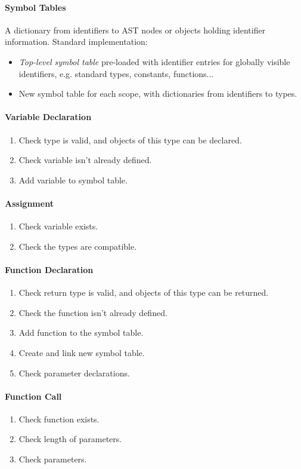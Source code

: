 \documentclass[twocolumn,english]{article}
\begin{document}
\paragraph{Symbol Tables}

A dictionary from identifiers to AST nodes or objects holding identifier
information. Standard implementation:
\begin{itemize}
\item \emph{Top-level symbol table} pre-loaded with identifier entries for
globally visible identifiers, e.g. standard types, constants, functions...
\item New symbol table for each scope, with dictionaries from identifiers
to types.
\end{itemize}

\paragraph{Variable Declaration}
\begin{enumerate}
\item Check type is valid, and objects of this type can be declared.
\item Check variable isn't already defined.
\item Add variable to symbol table.
\end{enumerate}

\paragraph{Assignment}
\begin{enumerate}
\item Check variable exists.
\item Check the types are compatible.
\end{enumerate}

\paragraph{Function Declaration}
\begin{enumerate}
\item Check return type is valid, and objects of this type can be returned.
\item Check the function isn't already defined.
\item Add function to the symbol table.
\item Create and link new symbol table.
\item Check parameter declarations.
\end{enumerate}

\paragraph{Function Call}
\begin{enumerate}
\item Check function exists.
\item Check length of parameters.
\item Check parameters.
\end{enumerate}
\end{document}
